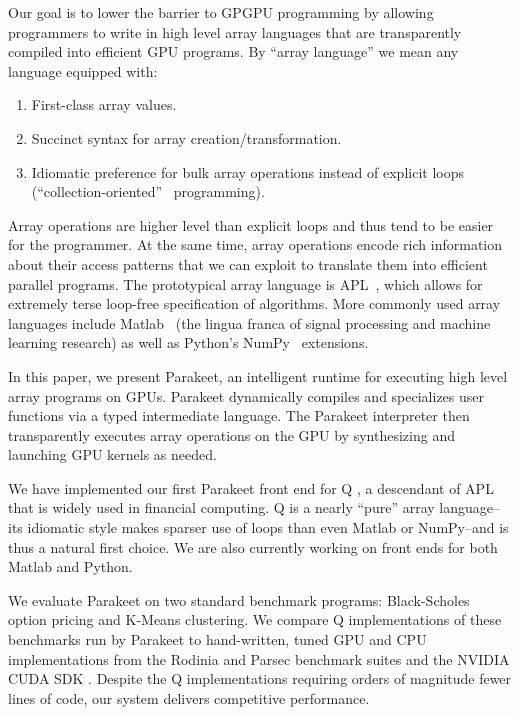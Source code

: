 \documentclass[preprint]{sigplanconf}
\begin{document}
Our goal is to lower the barrier to GPGPU programming by allowing programmers to
write in high level array languages that are transparently compiled into
efficient GPU programs. By ``array language'' we mean any language equipped
with:
\begin{enumerate}
\item First-class array values.
\item Succinct syntax for array creation/transformation.
\item Idiomatic preference for bulk array operations instead of explicit loops
(``collection-oriented''~\cite{Sip91} programming).
\end{enumerate}

Array operations are higher level than explicit loops and thus tend
to be easier for the programmer. At the same time, array operations encode rich
information about their access patterns that we can exploit to translate them
into efficient parallel programs. The prototypical array language is
APL~\cite{Iverson62}, which allows for extremely terse loop-free specification
of algorithms. More commonly used array languages include Matlab~\cite{Moler80}
(the lingua franca of signal processing and machine learning research) as well
as Python's NumPy~\cite{Oliphant07} extensions.

In this paper, we present Parakeet, an intelligent runtime for executing high
level array programs on GPUs. Parakeet dynamically compiles and specializes user
functions via a typed intermediate language.  The Parakeet interpreter then
transparently executes array operations on the GPU by synthesizing and launching
GPU kernels as needed.


We have implemented our first Parakeet front end for Q \cite{Borr08}, a
descendant of APL that is widely used in financial computing. 
Q is a nearly ``pure'' array language--its idiomatic style makes sparser use of
loops than even Matlab or NumPy--and is thus a natural first choice.
We are also currently working on front ends for both Matlab and Python.

We evaluate Parakeet on two standard benchmark programs: Black-Scholes option
pricing and K-Means clustering.  We compare Q implementations of these
benchmarks run by Parakeet to hand-written, tuned GPU and CPU implementations
from the Rodinia \cite{Che09} and Parsec \cite{Bien08} benchmark suites and the
NVIDIA CUDA SDK \cite{NvidSD}.  Despite the Q implementations requiring orders
of magnitude fewer lines of code, our system delivers competitive performance.
\end{document}
